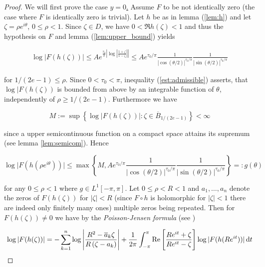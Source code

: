 \begin{proof}
	We will first prove the case \underline{$y = 0$.} Assume $F$ to be not identically zero (the case where $F$ is identically zero is trivial). Let $h$ be as in lemma (\ref{lem:h}) and let $\zeta = \rho e^{i\theta}$, $0 \leq \rho < 1$. Since $\zeta \in D$, we have $0 < \Re h(\zeta) < 1$ and thus the hypothesis on $F$ and lemma (\ref{lem:upper_bound}) yields

\begin{gather}
	\log \vert F(h(\zeta)) \vert \leq Ae^{\frac{\tau_0}{\pi}\left| \log\left| \frac{1 + \zeta}{1 - \zeta}\right|\right|} \leq Ae^{\tau_0/\pi}\frac{1}{\left| \cos(\theta/2) \right|^{\tau_0/\pi}}\frac{1}{\left| \sin(\theta/2) \right|^{\tau_0/\pi}}
	\label{est:admissible}
\end{gather}

	for $1/(2e - 1) \leq \rho$. Since $0 < \tau_0 < \pi$, inequality (\ref{est:admissible}) asserts, that $\log \vert F(h(\zeta))$ is bounded from above by an integrable function of $\theta$, independently of $\rho \geq 1/(2e - 1)$. Furthermore we have 

	\begin{equation}
		M := \sup\left\{\log \vert F(h(\zeta))\vert : \zeta \in \overline{B}_{1/\left( 2e - 1 \right)}\right\} < \infty
	\end{equation}

	\noindent since a upper semicontinuous function on a compact space attains its supremum (see lemma \ref{lem:semicom}). Hence

	\begin{equation}
		\log\vert F( h( \rho e^{i\theta} ))\vert \leq \max\left\{ M,   Ae^{\tau_0/\pi}\frac{1}{\left| \cos(\theta/2) \right|^{\tau_0/\pi}}\frac{1}{\left| \sin(\theta/2) \right|^{\tau_0/\pi}}\right\} =: g\left( \theta \right)
		\label{est:log}
	\end{equation}

	\noindent for any $0 \leq \rho < 1$ where $g \in L^1[-\pi,\pi]$. Let $0 \leq \rho < R < 1$ and $a_1,\dots,a_n$ denote the zeros of $F(h(\zeta))$ for $\left\vert \zeta\right\vert < R$ (since $F \circ h$ is holomorphic for $\left\vert \zeta\right\vert < 1$ there are indeed only finitely many ones) multiple zeros being repeated. Then for $F(h(\zeta)) \neq 0$ we have by the \emph{Poisson-Jensen formula} (see \cite[208]{ahlfors:complex_analysis:1979})

	\begin{equation}
		\log\vert F(h(\zeta))\vert = - \sum_{k = 1}^n \log\left\vert \frac{R^2 - \overline{a}_k\zeta}{R\left( \zeta - a_k \right)}\right\vert	+ \frac{1}{2\pi}\int_{-\pi}^\pi \operatorname{Re} \left[\frac{R e^{it} + \zeta}{R e^{it} - \zeta}\right]\log\vert F(h(R e^{it}))\vert\mathop{}\!\mathrm{d} t
	\end{equation}


\end{proof}
